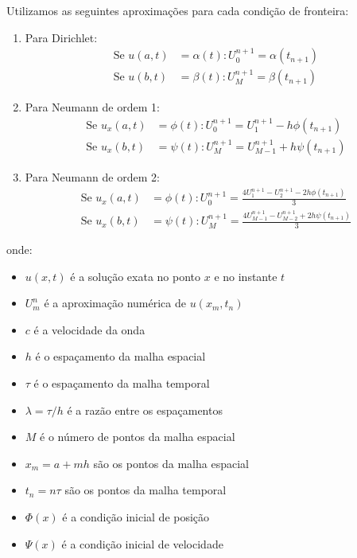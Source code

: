 \documentclass[column,amsmath,amssymb,floatfix]{revtex4}
\begin{document}
Utilizamos as seguintes aproximações para cada condição de fronteira:
\begin{enumerate}[label=\roman*.]
	\item Para Dirichlet:
	      \begin{align}
	      	\text{Se } u(a,t) & = \alpha(t): U_0^{n+1} = \alpha(t_{n+1}) \label{eq:dirichlet-a} \\
	      	\text{Se } u(b,t) & = \beta(t): U_M^{n+1} = \beta(t_{n+1}) \label{eq:dirichlet-b}   
	      \end{align}
	\item Para Neumann de ordem 1:
	      \begin{align}
	      	\text{Se } u_x(a,t) & = \phi(t): U_0^{n+1} = U_1^{n+1} - h\phi(t_{n+1}) \label{eq:neumman-1-a}     \\
	      	\text{Se } u_x(b,t) & = \psi(t): U_M^{n+1} = U_{M-1}^{n+1} + h\psi(t_{n+1}) \label{eq:neumman-1-b} 
	      \end{align}
	      	      
	\item Para Neumann de ordem 2:
	      \begin{align}
	      	\text{Se } u_x(a,t) & = \phi(t): U_0^{n+1} = \frac{4U_1^{n+1} - U_2^{n+1} - 2h\phi(t_{n+1})}{3}\label{eq:neumman-2-a}         \\
	      	\text{Se } u_x(b,t) & = \psi(t): U_M^{n+1} = \frac{4U_{M-1}^{n+1} - U_{M-2}^{n+1} + 2h\psi(t_{n+1})}{3}\label{eq:neumman-2-b} 
	      \end{align}    
\end{enumerate}

onde:
\begin{itemize}
	\item $u(x,t)$ é a solução exata no ponto $x$ e no instante $t$
	\item $U_m^n$ é a aproximação numérica de $u(x_m,t_n)$
	\item $c$ é a velocidade da onda
	\item $h$ é o espaçamento da malha espacial
	\item $\tau$ é o espaçamento da malha temporal
	\item $\lambda = \tau/h$ é a razão entre os espaçamentos
	\item $M$ é o número de pontos da malha espacial
	\item $x_m = a + mh$ são os pontos da malha espacial
	\item $t_n = n\tau$ são os pontos da malha temporal
	\item $\Phi(x)$ é a condição inicial de posição
	\item $\Psi(x)$ é a condição inicial de velocidade
\end{itemize}
\end{document}
